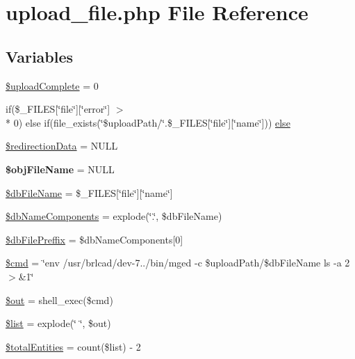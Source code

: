 \hypertarget{upload__file_8php}{\section{upload\-\_\-file.\-php File Reference}
\label{upload__file_8php}
}
\subsection*{Variables}
\begin{DoxyCompactItemize}
\item 
\hyperlink{upload__file_8php_a1f7d071bedb8673aa713baddd14e2ed1}{\$upload\-Complete} = 0
\item 
if(\$\-\_\-\-F\-I\-L\-E\-S\mbox{[}\char`\"{}file\char`\"{}\mbox{]}\mbox{[}\char`\"{}error\char`\"{}\mbox{]} $>$\\*
 0) else if(file\-\_\-exists(\char`\"{}\$upload\-Path/\char`\"{}.\$\-\_\-\-F\-I\-L\-E\-S\mbox{[}\char`\"{}file\char`\"{}\mbox{]}\mbox{[}\char`\"{}name\char`\"{}\mbox{]})) \hyperlink{upload__file_8php_a8991bab36794a3fd6413c85da0a3516b}{else}
\item 
\hyperlink{upload__file_8php_a4bfc4abb42c1a5571cc275eb8dc0de4c}{\$redirection\-Data} = N\-U\-L\-L
\item 
\hypertarget{upload__file_8php_a2e269ed8ee1613666988c90aa19c6a59}{{\bfseries \$obj\-File\-Name} = N\-U\-L\-L}\label{upload__file_8php_a2e269ed8ee1613666988c90aa19c6a59}

\item 
\hyperlink{upload__file_8php_ab20da318c11da52be7a0bd751aa80ba2}{\$db\-File\-Name} = \$\-\_\-\-F\-I\-L\-E\-S\mbox{[}\char`\"{}file\char`\"{}\mbox{]}\mbox{[}\char`\"{}name\char`\"{}\mbox{]}
\item 
\hyperlink{upload__file_8php_a82064fc59286d59cc519da100ff37a03}{\$db\-Name\-Components} = explode(\char`\"{}.\char`\"{}, \$db\-File\-Name)
\item 
\hyperlink{upload__file_8php_ad2ec2b4b4d7f2f14d90fa0a87387c143}{\$db\-File\-Preffix} = \$db\-Name\-Components\mbox{[}0\mbox{]}
\item 
\hyperlink{upload__file_8php_a9c87033fa49b61f753e3c263da5edeab}{\$cmd} = \char`\"{}env /usr/brlcad/dev-\/7../bin/mged -\/c \$upload\-Path/\$db\-File\-Name ls -\/a 2$>$\&1\char`\"{}
\item 
\hyperlink{upload__file_8php_a48cb304902320d173a4eaa41543327b9}{\$out} = shell\-\_\-exec(\$cmd)
\item 
\hyperlink{upload__file_8php_a358b00350db3d8f227d500337cc437af}{\$list} = explode(\char`\"{} \char`\"{}, \$out)
\item 
\hyperlink{upload__file_8php_a4176312f6451cbbe1bd9d40253527e1d}{\$total\-Entities} = count(\$list) -\/ 2
\end{DoxyCompactItemize}


